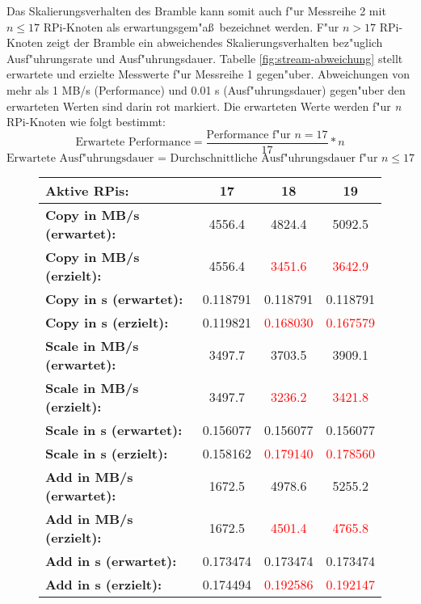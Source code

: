 Das Skalierungsverhalten des Bramble kann somit auch f"ur Messreihe 2 mit $n\leq 17$ RPi-Knoten als erwartungsgem"a\ss\ bezeichnet werden.  
\noindent
F"ur $n > 17$ RPi-Knoten zeigt der Bramble ein abweichendes Skalierungsverhalten bez"uglich Ausf"uhrungsrate und Ausf"uhrungsdauer. Tabelle \ref{fig:stream-abweichung} stellt erwartete und erzielte Messwerte f"ur Messreihe 1 gegen"uber. Abweichungen von mehr als 1 MB/s (Performance) und 0.01 s (Ausf"uhrungsdauer) gegen"uber den erwarteten Werten sind darin rot markiert. Die erwarteten Werte werden f"ur \textit{n} RPi-Knoten wie folgt bestimmt: 
\[\text{Erwartete Performance} = \frac{\text{Performance f"ur }n=17}{17}\ast n\] 
\[\text{Erwartete Ausf"uhrungsdauer = Durchschnittliche Ausf"uhrungsdauer f"ur }n\leq 17\]
\begin{figure}
  \centering
  \begin{tabular}{|l|c|c|c|}
    \hline 
    \textbf{Aktive RPis:} & \textbf{17} & \textbf{18} & \textbf{19}\\ 
    \hline 
    \textbf{Copy in MB/s (erwartet):} & 4556.4 & 4824.4 & 5092.5\\
    \hline 
    \textbf{Copy in MB/s (erzielt):} & 4556.4 & \textcolor{red}{3451.6} & \textcolor{red}{3642.9}\\
    \hline 
    \textbf{Copy in s (erwartet):} & 0.118791 & 0.118791 & 0.118791\\
    \hline 
    \textbf{Copy in s (erzielt):} & 0.119821 & \textcolor{red}{0.168030} & \textcolor{red}{0.167579}\\
    \hline 
    \textbf{Scale in MB/s (erwartet):} & 3497.7 & 3703.5 & 3909.1\\
    \hline 
    \textbf{Scale in MB/s (erzielt):} & 3497.7 & \textcolor{red}{3236.2} & \textcolor{red}{3421.8}\\
    \hline 
	\textbf{Scale in s (erwartet):} & 0.156077 & 0.156077 & 0.156077\\
    \hline 
    \textbf{Scale in s (erzielt):} & 0.158162 & \textcolor{red}{0.179140} & \textcolor{red}{0.178560}\\
    \hline 
    \textbf{Add in MB/s (erwartet):} & 1672.5 & 4978.6 & 5255.2\\
    \hline 
    \textbf{Add in MB/s (erzielt):} & 1672.5 & \textcolor{red}{4501.4} & \textcolor{red}{4765.8}\\
    \hline 
    \textbf{Add in s (erwartet):} & 0.173474 & 0.173474 & 0.173474\\
    \hline 
    \textbf{Add in s (erzielt):} & 0.174494 & \textcolor{red}{0.192586} & \textcolor{red}{0.192147}\\

\end{tabular}
\end{figure}
